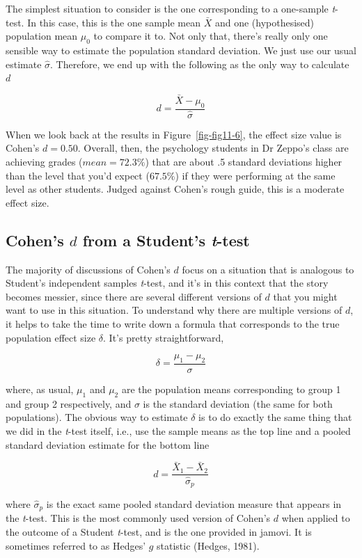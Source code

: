 \documentclass[
  a4paper,
]{book}
\begin{document}
The simplest situation to consider is the one corresponding to a
one-sample \emph{t}-test. In this case, this is the one sample mean
\(\bar{X}\) and one (hypothesised) population mean \(\mu_0\) to compare
it to. Not only that, there's really only one sensible way to estimate
the population standard deviation. We just use our usual estimate
\(\hat{\sigma}\). Therefore, we end up with the following as the only
way to calculate \(d\)

\[d=\frac{\bar{X}-\mu_0}{\hat{\sigma}}\]

When we look back at the results in Figure~\ref{fig-fig11-6}, the effect
size value is Cohen's \(d = 0.50\). Overall, then, the psychology
students in Dr Zeppo's class are achieving grades (\(mean = 72.3\%\))
that are about .5 standard deviations higher than the level that you'd
expect (\(67.5\%\)) if they were performing at the same level as other
students. Judged against Cohen's rough guide, this is a moderate effect
size.

\hypertarget{cohens-d-from-a-students-t-test}{%
\subsection{\texorpdfstring{Cohen's \(d\) from a Student's
\emph{t}-test}{Cohen's d from a Student's t-test}}\label{cohens-d-from-a-students-t-test}}

The majority of discussions of Cohen's \(d\) focus on a situation that
is analogous to Student's independent samples \emph{t}-test, and it's in
this context that the story becomes messier, since there are several
different versions of \(d\) that you might want to use in this
situation. To understand why there are multiple versions of \(d\), it
helps to take the time to write down a formula that corresponds to the
true population effect size \(\delta\). It's pretty straightforward,

\[\delta=\frac{\mu_1-\mu_2}{\sigma}\]

where, as usual, \(\mu_1\) and \(\mu_2\) are the population means
corresponding to group 1 and group 2 respectively, and \(\sigma\) is the
standard deviation (the same for both populations). The obvious way to
estimate \(\delta\) is to do exactly the same thing that we did in the
\emph{t}-test itself, i.e., use the sample means as the top line and a
pooled standard deviation estimate for the bottom line

\[d=\frac{\bar{X}_1-\bar{X}_2}{\hat{\sigma}_p}\]

where \(\hat{\sigma}_p\) is the exact same pooled standard deviation
measure that appears in the \emph{t}-test. This is the most commonly
used version of Cohen's \(d\) when applied to the outcome of a Student
\emph{t}-test, and is the one provided in jamovi. It is sometimes
referred to as Hedges' \(g\) statistic (Hedges, 1981).
\end{document}
